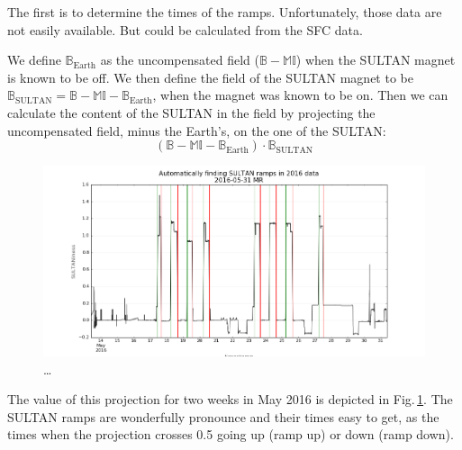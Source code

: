 The first is to determine the times of the ramps. Unfortunately, those data are not easily available. But could be calculated from the SFC data.

We define $\mathbb{B}_\text{Earth}$ as the uncompensated field ($\mathbb{B} - \mathbb{M} \mathbb{I}$) when the SULTAN magnet is known to be off. We then define the field of the SULTAN magnet to be $\mathbb{B}_\text{SULTAN} = \mathbb{B} - \mathbb{M} \mathbb{I} - \mathbb{B}_\text{Earth}$, when the magnet was known to be on. Then we can calculate the content of the SULTAN in the field by projecting the uncompensated field, minus the Earth's, on the one of the SULTAN\@:
\begin{equation}
  \left( \mathbb{B} - \mathbb{M} \mathbb{I} - \mathbb{B}_\text{Earth} \right) \cdot \mathbb{B}_\text{SULTAN}  
\end{equation}

\begin{figure}
  \centering
  \includegraphics[width=\linewidth]{gfx/nEDM_SFC/finding_SULTAN_ramps.png}
  \caption{\ldots}
  \label{fig:finding_SULTAN_ramps}
\end{figure}

The value of this projection for two weeks in May 2016 is depicted in Fig.\,\ref{fig:finding_SULTAN_ramps}. The SULTAN ramps are wonderfully pronounce and their times easy to get, as the times when the projection crosses 0.5 going up (ramp up) or down (ramp down).

